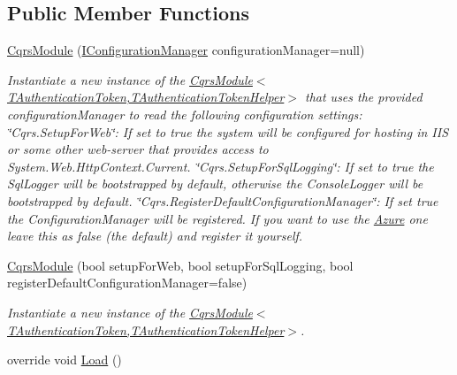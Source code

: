 \subsection*{Public Member Functions}
\begin{DoxyCompactItemize}
\item 
\hyperlink{classCqrs_1_1Ninject_1_1Configuration_1_1CqrsModule_a31a1047d3940842b760ad2a796aa1606_a31a1047d3940842b760ad2a796aa1606}{Cqrs\+Module} (\hyperlink{interfaceCqrs_1_1Configuration_1_1IConfigurationManager}{I\+Configuration\+Manager} configuration\+Manager=null)
\begin{DoxyCompactList}\small\item\em Instantiate a new instance of the \hyperlink{classCqrs_1_1Ninject_1_1Configuration_1_1CqrsModule_a31a1047d3940842b760ad2a796aa1606_a31a1047d3940842b760ad2a796aa1606}{Cqrs\+Module$<$\+T\+Authentication\+Token,\+T\+Authentication\+Token\+Helper$>$} that uses the provided {\itshape configuration\+Manager}  to read the following configuration settings\+: \char`\"{}\+Cqrs.\+Setup\+For\+Web\char`\"{}\+: If set to true the system will be configured for hosting in I\+IS or some other web-\/server that provides access to System.\+Web.\+Http\+Context.\+Current. \char`\"{}\+Cqrs.\+Setup\+For\+Sql\+Logging\char`\"{}\+: If set to true the Sql\+Logger will be bootstrapped by default, otherwise the Console\+Logger will be bootstrapped by default. \char`\"{}\+Cqrs.\+Register\+Default\+Configuration\+Manager\char`\"{}\+: If set true the Configuration\+Manager will be registered. If you want to use the \hyperlink{namespaceCqrs_1_1Ninject_1_1Azure}{Azure} one leave this as false (the default) and register it yourself. \end{DoxyCompactList}\item 
\hyperlink{classCqrs_1_1Ninject_1_1Configuration_1_1CqrsModule_a197055fca498bff31fd9a91a2a07292d_a197055fca498bff31fd9a91a2a07292d}{Cqrs\+Module} (bool setup\+For\+Web, bool setup\+For\+Sql\+Logging, bool register\+Default\+Configuration\+Manager=false)
\begin{DoxyCompactList}\small\item\em Instantiate a new instance of the \hyperlink{classCqrs_1_1Ninject_1_1Configuration_1_1CqrsModule_a31a1047d3940842b760ad2a796aa1606_a31a1047d3940842b760ad2a796aa1606}{Cqrs\+Module$<$\+T\+Authentication\+Token,\+T\+Authentication\+Token\+Helper$>$}. \end{DoxyCompactList}\item 
override void \hyperlink{classCqrs_1_1Ninject_1_1Configuration_1_1CqrsModule_a8cf4c81c21496699b2f32112b23308fe_a8cf4c81c21496699b2f32112b23308fe}{Load} ()

\end{DoxyCompactItemize}
